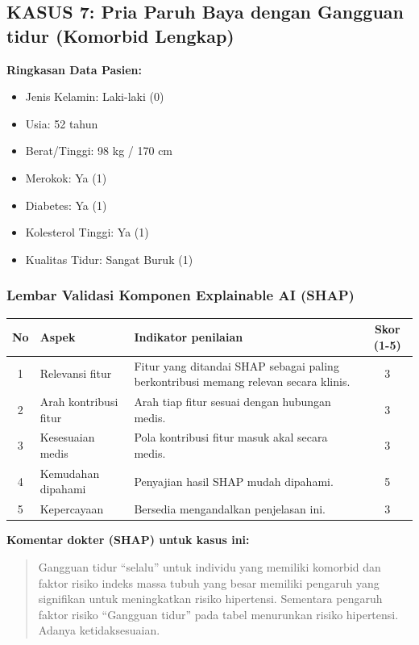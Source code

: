 \vspace{1.5cm}

\subsection*{KASUS 7: Pria Paruh Baya dengan Gangguan tidur (Komorbid Lengkap)}
\textbf{Ringkasan Data Pasien:}
\begin{itemize}
    \item Jenis Kelamin: Laki-laki (0)
    \item Usia: 52 tahun
    \item Berat/Tinggi: 98 kg / 170 cm
    \item Merokok: Ya (1)
    \item Diabetes: Ya (1)
    \item Kolesterol Tinggi: Ya (1)
    \item Kualitas Tidur: Sangat Buruk (1)
\end{itemize}

\subsubsection*{Lembar Validasi Komponen Explainable AI (SHAP)}
\begin{center}
\begin{tabular}{|c|p{3.5cm}|p{7.5cm}|c|}
\hline
\textbf{No} & \textbf{Aspek} & \textbf{Indikator penilaian} & \textbf{Skor (1-5)} \\ \hline
1 & Relevansi fitur & Fitur yang ditandai SHAP sebagai paling berkontribusi memang relevan secara klinis. & 3 \\ \hline
2 & Arah kontribusi fitur & Arah tiap fitur sesuai dengan hubungan medis. & 3 \\ \hline
3 & Kesesuaian medis & Pola kontribusi fitur masuk akal secara medis. & 3 \\ \hline
4 & Kemudahan dipahami & Penyajian hasil SHAP mudah dipahami. & 5 \\ \hline
5 & Kepercayaan & Bersedia mengandalkan penjelasan ini. & 3 \\ \hline
\end{tabular}
\end{center}

\textbf{Komentar dokter (SHAP) untuk kasus ini:}
\begin{quote}
Gangguan tidur ``selalu'' untuk individu yang memiliki komorbid dan faktor risiko indeks massa tubuh yang besar memiliki pengaruh yang signifikan untuk meningkatkan risiko hipertensi. Sementara pengaruh faktor risiko ``Gangguan tidur'' pada tabel menurunkan risiko hipertensi. Adanya ketidaksesuaian.
\end{quote}

